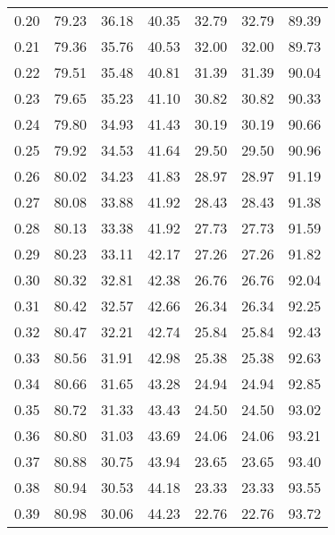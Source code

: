 \begin{tabular}{|c|c|c|c|c|c|c|}
      0.20 &     79.23 &     36.18 &      40.35 &   32.79 &      32.79 &         89.39 \\
      0.21 &     79.36 &     35.76 &      40.53 &   32.00 &      32.00 &         89.73 \\
      0.22 &     79.51 &     35.48 &      40.81 &   31.39 &      31.39 &         90.04 \\
      0.23 &     79.65 &     35.23 &      41.10 &   30.82 &      30.82 &         90.33 \\
      0.24 &     79.80 &     34.93 &      41.43 &   30.19 &      30.19 &         90.66 \\
      0.25 &     79.92 &     34.53 &      41.64 &   29.50 &      29.50 &         90.96 \\
      0.26 &     80.02 &     34.23 &      41.83 &   28.97 &      28.97 &         91.19 \\
      0.27 &     80.08 &     33.88 &      41.92 &   28.43 &      28.43 &         91.38 \\
      0.28 &     80.13 &     33.38 &      41.92 &   27.73 &      27.73 &         91.59 \\
      0.29 &     80.23 &     33.11 &      42.17 &   27.26 &      27.26 &         91.82 \\
      0.30 &     80.32 &     32.81 &      42.38 &   26.76 &      26.76 &         92.04 \\
      0.31 &     80.42 &     32.57 &      42.66 &   26.34 &      26.34 &         92.25 \\
      0.32 &     80.47 &     32.21 &      42.74 &   25.84 &      25.84 &         92.43 \\
      0.33 &     80.56 &     31.91 &      42.98 &   25.38 &      25.38 &         92.63 \\
      0.34 &     80.66 &     31.65 &      43.28 &   24.94 &      24.94 &         92.85 \\
      0.35 &     80.72 &     31.33 &      43.43 &   24.50 &      24.50 &         93.02 \\
      0.36 &     80.80 &     31.03 &      43.69 &   24.06 &      24.06 &         93.21 \\
      0.37 &     80.88 &     30.75 &      43.94 &   23.65 &      23.65 &         93.40 \\
      0.38 &     80.94 &     30.53 &      44.18 &   23.33 &      23.33 &         93.55 \\
      0.39 &     80.98 &     30.06 &      44.23 &   22.76 &      22.76 &         93.72 \\

\end{tabular}

